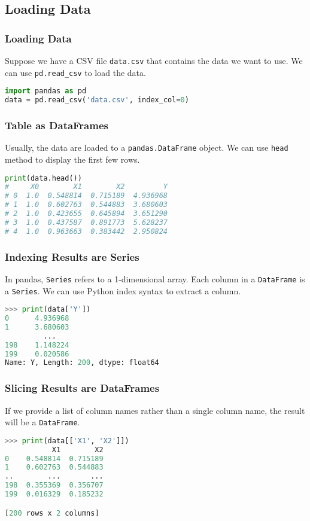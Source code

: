 \documentclass[beamer, en, version=2.0]{huangfusl-template}
\begin{document}
    \subsection{Loading Data}
    \begin{frame}[fragile]
        \frametitle{Loading Data}

        Suppose we have a CSV file {\footnotesize\verb|data.csv|} that contains the data we want to use. We can use {\color{blue}\footnotesize\verb|pd.read_csv|} to load the data.

\begin{lstlisting}[language=python]
import pandas as pd
data = pd.read_csv('data.csv', index_col=0)
\end{lstlisting}
    \end{frame}
    \begin{frame}[fragile]
        \frametitle{Table as DataFrames}

        Usually, the data are loaded to a {\color{blue}\footnotesize\verb|pandas.DataFrame|} object. We can use {\color{blue}\footnotesize\verb|head|} method to display the first few rows.

\begin{lstlisting}[language=python]
print(data.head())
#     X0        X1        X2         Y
# 0  1.0  0.548814  0.715189  4.936968
# 1  1.0  0.602763  0.544883  3.680603
# 2  1.0  0.423655  0.645894  3.651290
# 3  1.0  0.437587  0.891773  5.628237
# 4  1.0  0.963663  0.383442  2.950824
\end{lstlisting}
    \end{frame}
    \begin{frame}[fragile]
        \frametitle{Indexing Results are Series}

        In pandas, {\color{blue}\footnotesize\verb|Series|} refers to a 1-dimensional array. Each column in a {\color{blue}\footnotesize\verb|DataFrame|} is a {\color{blue}\footnotesize\verb|Series|}. We can use Python index syntax to extract a column.

\begin{lstlisting}[language=python]
>>> print(data['Y'])
0      4.936968
1      3.680603
         ...   
198    1.148224
199    0.020586
Name: Y, Length: 200, dtype: float64
\end{lstlisting}
    \end{frame}
    \begin{frame}[fragile]
        \frametitle{Slicing Results are DataFrames}

        If we provide a list of column names rather than a single column name, the result will be a {\color{blue}\footnotesize\verb|DataFrame|}.

\begin{lstlisting}[language=python]
>>> print(data[['X1', 'X2']])
           X1        X2
0    0.548814  0.715189
1    0.602763  0.544883
..        ...       ...
198  0.355369  0.356707
199  0.016329  0.185232

[200 rows x 2 columns]
\end{lstlisting}
    \end{frame}
\end{document}

